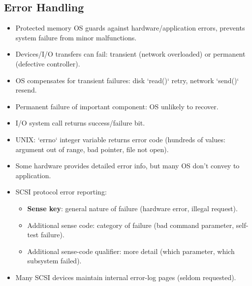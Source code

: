\subsection{Error Handling}
\begin{itemize}
    \item Protected memory OS guards against hardware/application errors, prevents system failure from minor malfunctions.
    \item Devices/I/O transfers can fail: transient (network overloaded) or permanent (defective controller).
    \item OS compensates for transient failures: disk `read()` retry, network `send()` resend.
    \item Permanent failure of important component: OS unlikely to recover.
    \item I/O system call returns success/failure bit.
    \item UNIX: `errno` integer variable returns error code (hundreds of values: argument out of range, bad pointer, file not open).
    \item Some hardware provides detailed error info, but many OS don't convey to application.
    \item SCSI protocol error reporting:
    \begin{itemize}
        \item \textbf{Sense key}: general nature of failure (hardware error, illegal request).
        \item Additional sense code: category of failure (bad command parameter, self-test failure).
        \item Additional sense-code qualifier: more detail (which parameter, which subsystem failed).
    \end{itemize}
    \item Many SCSI devices maintain internal error-log pages (seldom requested).
\end{itemize}

